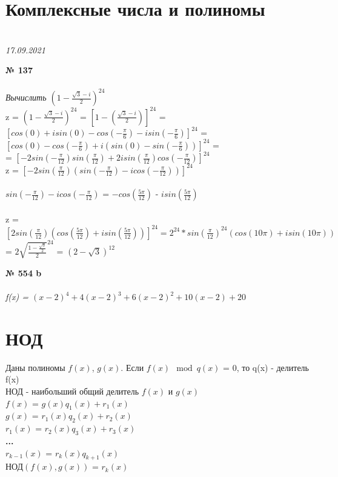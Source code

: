 \documentclass[12pt]{article}
\begin{document}
	\section{Комплексные числа и полиномы}
		{\\ 
		\hfill \textit{17.09.2021}\\ \vspace{1cm}}
	
{
{\textbf{№ 137}\\ \vspace{.25cm}\\}
\textit{\large{Вычислить $(1-\frac{\sqrt{3}-i}{2})^{24}$}}\vspace{.25cm}\\

z = {$(1-\frac{\sqrt{3}-i}{2})^{24}$ = $[1 - (\frac{\sqrt{3}-i}{2})]^{24}$ = $[cos(0)+isin(0)-cos(-\frac{\pi}{6})-isin(-\frac{\pi}{6})]^{24}$ = $[cos(0)-cos(-\frac{\pi}{6}) + i(sin(0) - sin(-\frac{\pi}{6}))]^{24}$ =\\= $[-2sin(-\frac{\pi}{12})sin(\frac{\pi}{12}) + 2isin(\frac{\pi}{12})cos(-\frac{\pi}{12})]^{24}$}\\
z = $[-2sin(\frac{\pi}{12})(sin(-\frac{\pi}{12})-icos(-\frac{\pi}{12}))]^{24}$\\\\
$sin(-\frac{\pi}{12})-icos(-\frac{\pi}{12})$ = $-cos(\frac{5\pi}{12})$ - $isin(\frac{5\pi}{12})$\\\\
z = $[2sin(\frac{\pi}{12})(cos(\frac{5\pi}{12}) + isin(\frac{5\pi}{12}))]^{24}=2^{24}*sin(\frac{\pi}{12})^{24}(cos(10\pi)+isin(10\pi))$ = $2\sqrt{\frac{1-\frac{\sqrt{3}}{2}}{2}}^{24}$ = $(2-\sqrt{3})^{12}$\\

}
\vspace{1cm}
{
{\textbf{№ 554 b}\\ \vspace{.25cm}\\}
\textit{f(x) = $(x-2)^4+4(x-2)^3+6(x-2)^2+10(x-2)+20$}

}
\newpage
\section{НОД}
Даны полиномы $f(x)$, $g(x)$. Если $f(x)\mod{q(x)}$ = 0, то q(x) - делитель f(x)\\
НОД - наибольший общий делитель $f(x)$ и $g(x)$\\
$f(x)$ = $g(x)q_1(x)+r_1(x)$\\
$g(x)$ = $r_1(x)q_2(x)+r_2(x)$\\
$r_1(x)$ = $r_2(x)q_3(x)+r_3(x)$\\
\textbf{...}\\
$r_{k-1}(x)$ = $r_k(x)q_{k+1}(x)$\\
НОД$(f(x), g(x))$ = $r_k(x)$
\end{document}
